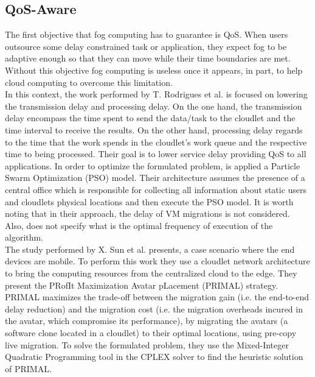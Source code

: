 \subsection{QoS-Aware}\label{sec:QoS}
The first objective that fog computing has to guarantee is QoS. When users outsource some delay constrained task or application, they expect fog to be adaptive enough so that they can move while their time boundaries are met. Without this objective fog computing is useless once it appears, in part, to help cloud computing to overcome this limitation.\\
\noindent\tab In this context, the work performed by T. Rodrigues \cite{rodrigues2017pso} et al. is focused on lowering the transmission delay and processing delay. On the one hand, the transmission delay encompass the time spent to send the data/task to the cloudlet and the time interval to receive the results. On the other hand, processing delay regards to the time that the work spends in the cloudlet's work queue and the respective time to being processed. Their goal is to lower service delay providing QoS to all applications. In order to optimize the formulated problem, is applied a Particle Swarm Optimization (PSO) model. Their architecture assumes the presence of a central office which is responsible for collecting all information about static users and cloudlets physical locations and then execute the PSO model. It is worth noting that in their approach, the delay of VM migrations is not considered. Also, does not specify what is the optimal frequency of execution of the algorithm.\\
\noindent\tab The study performed by X. Sun et al. \cite{sun2016primal} presents, a case scenario where the end devices are mobile. To perform this work they use a cloudlet network architecture to bring the computing resources from the centralized cloud to the edge. They present the PRofIt Maximization Avatar pLacement (PRIMAL) strategy. PRIMAL maximizes the trade-off between the migration gain (i.e. the end-to-end delay reduction) and the migration cost (i.e. the migration overheads incured in the avatar, which compromise its performance), by migrating the avatars (a software clone located in a cloudlet) to their optimal locations, using  pre-copy live migration. To solve the formulated problem, they use the Mixed-Integer Quadratic Programming tool in the CPLEX solver to find the heuristic solution of PRIMAL.\\

